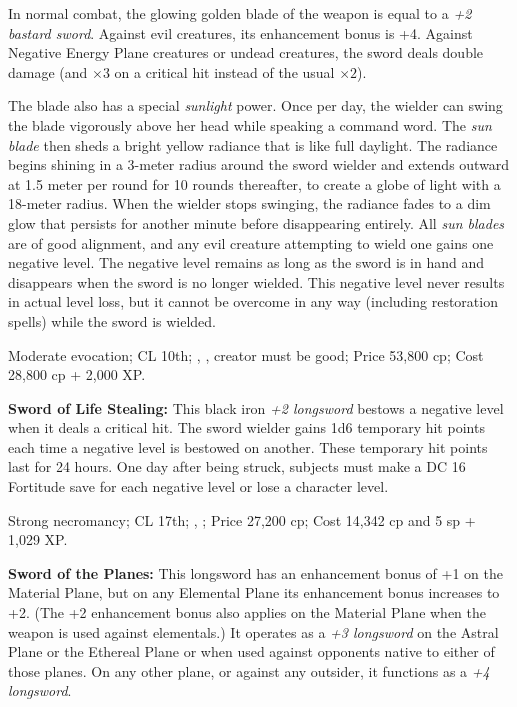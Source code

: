 In normal combat, the glowing golden blade of the weapon is equal to a \emph{+2 bastard sword}. Against evil creatures, its enhancement bonus is +4. Against Negative Energy Plane creatures or undead creatures, the sword deals double damage (and $\times3$ on a critical hit instead of the usual $\times2$).

The blade also has a special \emph{sunlight} power. Once per day, the wielder can swing the blade vigorously above her head while speaking a command word. The \emph{sun blade} then sheds a bright yellow radiance that is like full daylight. The radiance begins shining in a 3-meter radius around the sword wielder and extends outward at 1.5 meter per round for 10 rounds thereafter, to create a globe of light with a 18-meter radius. When the wielder stops swinging, the radiance fades to a dim glow that persists for another minute before disappearing entirely. All \emph{sun blades} are of good alignment, and any evil creature attempting to wield one gains one negative level. The negative level remains as long as the sword is in hand and disappears when the sword is no longer wielded. This negative level never results in actual level loss, but it cannot be overcome in any way (including restoration spells) while the sword is wielded.

Moderate evocation; CL 10th; , , creator must be good; Price 53,800 cp; Cost 28,800 cp + 2,000 XP.

\textbf{Sword of Life Stealing:} This black iron \emph{+2 longsword} bestows a negative level when it deals a critical hit. The sword wielder gains 1d6 temporary hit points each time a negative level is bestowed on another. These temporary hit points last for 24 hours. One day after being struck, subjects must make a DC 16 Fortitude save for each negative level or lose a character level.

Strong necromancy; CL 17th; , ; Price 27,200 cp; Cost 14,342 cp and 5 sp + 1,029 XP.

\textbf{Sword of the Planes:} This longsword has an enhancement bonus of +1 on the Material Plane, but on any Elemental Plane its enhancement bonus increases to +2. (The +2 enhancement bonus also applies on the Material Plane when the weapon is used against elementals.) It operates as a \emph{+3 longsword} on the Astral Plane or the Ethereal Plane or when used against opponents native to either of those planes. On any other plane, or against any outsider, it functions as a \emph{+4 longsword}.

